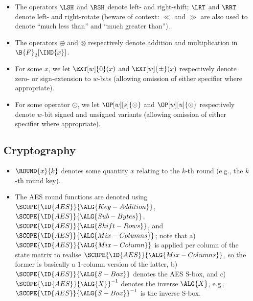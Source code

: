 \begin{itemize}

\item The operators $\LSH$ and $\RSH$ denote left- and right-shift; $\LRT$ and
      $\RRT$ denote left- and right-rotate (beware of context: $\ll$ and $\gg$
      are also used to denote ``much less than'' and ``much greater than'').
\item The operators 
      $\oplus$
      and
      $\otimes$
      respectively denote addition and multiplication in $\B{F}_2[\IND{x}]$.
\item For some $x$, 
      we let
      $\EXT[w]{0  }( x )$
      and
      $\EXT[w]{\pm}( x )$
      respectively denote
      zero- or sign-extension to $w$-bits
      (allowing omission of either specifier where appropriate).
\item For some operator $\odot$, 
      we let
      $\OP[w][s]{\odot}$
      and 
      $\OP[w][u]{\odot}$
      respectively denote 
      $w$-bit signed and unsigned variants
      (allowing omission of either specifier where appropriate).

\end{itemize}


\subsection{Cryptography}

\begin{itemize}

\item $\ROUND{x}{k}$ denotes some quantity $x$ relating to the $k$-th 
      round (e.g., the $k$-th round key).
\item The AES round functions are denoted using
      $\SCOPE{\ID{AES}}{\ALG{Key-Addition}}$,
      $\SCOPE{\ID{AES}}{\ALG{Sub-Bytes}}$,
      $\SCOPE{\ID{AES}}{\ALG{Shift-Rows}}$,
      and
      $\SCOPE{\ID{AES}}{\ALG{Mix-Columns}}$;
      note that 
      a) $\SCOPE{\ID{AES}}{\ALG{Mix-Column}}$ is applied per column of the
         state matrix to realise $\SCOPE{\ID{AES}}{\ALG{Mix-Columns}}$, so
         the former is basically a $1$-column version of the latter,
      b) $\SCOPE{\ID{AES}}{\ALG{S-Box}}$ denotes the AES S-box,
         and
      c) $\SCOPE{\ID{AES}}{\ALG{X}}^{-1}$ denotes the inverse $\ALG{X}$,
         e.g., $\SCOPE{\ID{AES}}{\ALG{S-Box}}^{-1}$ is the inverse S-box.

\end{itemize}

